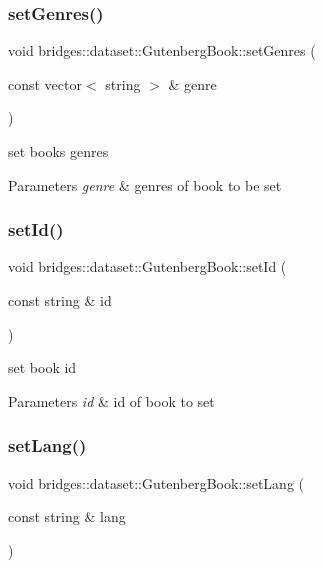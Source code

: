 \subsubsection{\texorpdfstring{set\+Genres()}{setGenres()}}
{\footnotesize\ttfamily void bridges\+::dataset\+::\+Gutenberg\+Book\+::set\+Genres (\begin{DoxyParamCaption}\item[{const vector$<$ string $>$ \&}]{genre }\end{DoxyParamCaption})\hspace{0.3cm}{\ttfamily [inline]}}

set book\textquotesingle{}s genres 
\begin{DoxyParams}{Parameters}
{\em genre} & genres of book to be set \\
\hline
\end{DoxyParams}
\mbox{\label{classbridges_1_1dataset_1_1_gutenberg_book_a8878c16267f29b4a532f60a1d54564f4}} 
\subsubsection{\texorpdfstring{set\+Id()}{setId()}}
{\footnotesize\ttfamily void bridges\+::dataset\+::\+Gutenberg\+Book\+::set\+Id (\begin{DoxyParamCaption}\item[{const string \&}]{id }\end{DoxyParamCaption})\hspace{0.3cm}{\ttfamily [inline]}}

set book id 
\begin{DoxyParams}{Parameters}
{\em id} & id of book to set \\
\hline
\end{DoxyParams}
\mbox{\label{classbridges_1_1dataset_1_1_gutenberg_book_a2dc5e0fd2629993fdf64ce98466eaa4d}} 
\subsubsection{\texorpdfstring{set\+Lang()}{setLang()}}
{\footnotesize\ttfamily void bridges\+::dataset\+::\+Gutenberg\+Book\+::set\+Lang (\begin{DoxyParamCaption}\item[{const string \&}]{lang }\end{DoxyParamCaption})\hspace{0.3cm}{\ttfamily [inline]}}


